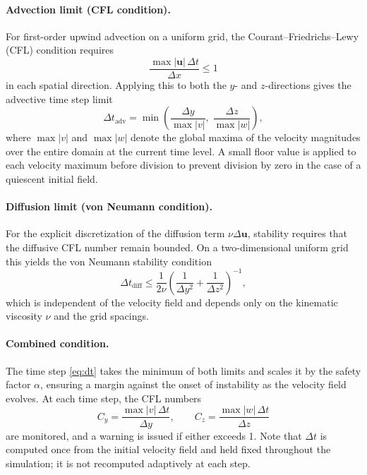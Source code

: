 \paragraph{Advection limit (CFL condition).}
For first-order upwind advection on a uniform grid, the
Courant--Friedrichs--Lewy (CFL) condition requires
\begin{equation}
    \frac{\max|\mathbf{u}|\,\Delta t}{\Delta x} \leq 1
\end{equation}
in each spatial direction. Applying this to both the $y$- and
$z$-directions gives the advective time step limit
\begin{equation}
    \Delta t_{\mathrm{adv}} = \min\!\left(
        \frac{\Delta y}{\max|v|},\;
        \frac{\Delta z}{\max|w|}
    \right),
    \label{eq:dt_adv}
\end{equation}
where $\max|v|$ and $\max|w|$ denote the global maxima of the velocity
magnitudes over the entire domain at the current time level. A small
floor value is applied to each velocity maximum before division to
prevent division by zero in the case of a quiescent initial field.

\paragraph{Diffusion limit (von Neumann condition).}
For the explicit discretization of the diffusion term $\nu\Delta
\mathbf{u}$, stability requires that the diffusive CFL number remain
bounded. On a two-dimensional uniform grid this yields the von Neumann
stability condition
\begin{equation}
    \Delta t_{\mathrm{diff}} \leq \frac{1}{2\nu}
    \left(\frac{1}{\Delta y^2} + \frac{1}{\Delta z^2}\right)^{-1},
    \label{eq:dt_diff}
\end{equation}
which is independent of the velocity field and depends only on the
kinematic viscosity $\nu$ and the grid spacings.

\paragraph{Combined condition.}
The time step \eqref{eq:dt} takes the minimum of both limits and
scales it by the safety factor $\alpha$, ensuring a margin against
the onset of instability as the velocity field evolves. At each time
step, the CFL numbers
\begin{equation}
    C_y = \frac{\max|v|\,\Delta t}{\Delta y}, \qquad
    C_z = \frac{\max|w|\,\Delta t}{\Delta z}
\end{equation}
are monitored, and a warning is issued if either exceeds 1.
Note that $\Delta t$ is computed once from the initial velocity field
and held fixed throughout the simulation; it is not recomputed
adaptively at each step.

